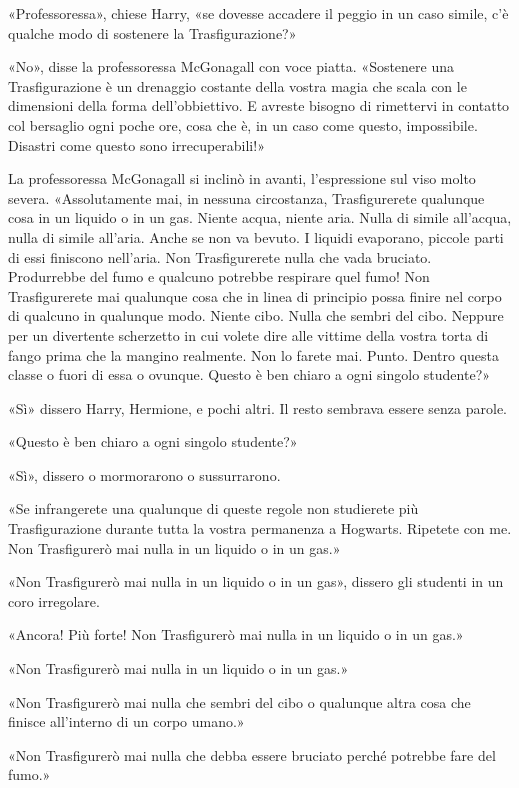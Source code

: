 «Professoressa», chiese Harry, «se dovesse accadere il peggio in un caso simile, c’è qualche modo di sostenere la Trasfigurazione?»

«No», disse la professoressa McGonagall con voce piatta. «Sostenere una Trasfigurazione è un drenaggio costante della vostra magia che scala con le dimensioni della forma dell’obbiettivo. E avreste bisogno di rimettervi in contatto col bersaglio ogni poche ore, cosa che è, in un caso come questo, impossibile. Disastri come questo sono irrecuperabili!»

La professoressa McGonagall si inclinò in avanti, l’espressione sul viso molto severa. «Assolutamente mai, in nessuna circostanza, Trasfigurerete qualunque cosa in un liquido o in un gas. Niente acqua, niente aria. Nulla di simile all’acqua, nulla di simile all’aria. Anche se non va bevuto. I liquidi evaporano, piccole parti di essi finiscono nell’aria. Non Trasfigurerete nulla che vada bruciato. Produrrebbe del fumo e qualcuno potrebbe respirare quel fumo! Non Trasfigurerete mai qualunque cosa che in linea di principio possa finire nel corpo di qualcuno in qualunque modo. Niente cibo. Nulla che sembri del cibo. Neppure per un divertente scherzetto in cui volete dire alle vittime della vostra torta di fango prima che la mangino realmente. Non lo farete mai. Punto. Dentro questa classe o fuori di essa o ovunque. Questo è ben chiaro a ogni singolo studente?»

«Sì» dissero Harry, Hermione, e pochi altri. Il resto sembrava essere senza parole.

«Questo è ben chiaro a ogni singolo studente?»

«Sì», dissero o mormorarono o sussurrarono.

«Se infrangerete una qualunque di queste regole non studierete più Trasfigurazione durante tutta la vostra permanenza a Hogwarts. Ripetete con me. Non Trasfigurerò mai nulla in un liquido o in un gas.»

«Non Trasfigurerò mai nulla in un liquido o in un gas», dissero gli studenti in un coro irregolare.

«Ancora! Più forte! Non Trasfigurerò mai nulla in un liquido o in un gas.»

«Non Trasfigurerò mai nulla in un liquido o in un gas.»

«Non Trasfigurerò mai nulla che sembri del cibo o qualunque altra cosa che finisce all’interno di un corpo umano.»

«Non Trasfigurerò mai nulla che debba essere bruciato perché potrebbe fare del fumo.»

